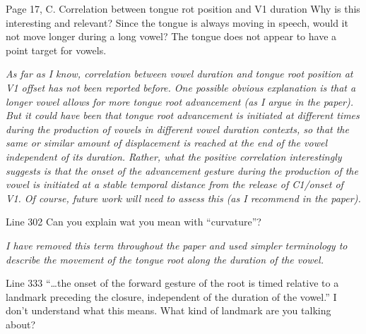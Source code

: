 \documentclass[]{article}
\begin{document}
Page 17, C. Correlation between tongue rot position and V1 duration Why
is this interesting and relevant? Since the tongue is always moving in
speech, would it not move longer during a long vowel? The tongue does
not appear to have a point target for vowels.

\begin{adjustwidth}{1cm}{} \textit{
As far as I know, correlation between vowel duration and tongue root position at V1 offset has not been reported before. One possible obvious explanation is that a longer vowel allows for more tongue root advancement (as I argue in the paper). But it could have been that tongue root advancement is initiated at different times during the production of vowels in different vowel duration contexts, so that the same or similar amount of displacement is reached at the end of the vowel independent of its duration. Rather, what the positive correlation interestingly suggests is that the onset of the advancement gesture during the production of the vowel is initiated at a stable temporal distance from the release of C1/onset of V1. Of course, future work will need to assess this (as I recommend in the paper).
} \end{adjustwidth}

Line 302 Can you explain wat you mean with ``curvature''?

\begin{adjustwidth}{1cm}{} \textit{
I have removed this term throughout the paper and used simpler terminology to describe the movement of the tongue root along the duration of the vowel.
} \end{adjustwidth}

Line 333 ``\ldots{}the onset of the forward gesture of the root is timed
relative to a landmark preceding the closure, independent of the
duration of the vowel.'' I don't understand what this means. What kind
of landmark are you talking about?
\end{document}
